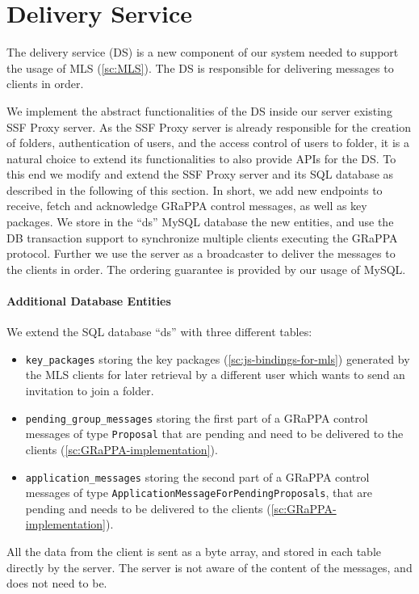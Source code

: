 \section{Delivery Service}\label{ssc:delivery-service}

The delivery service (DS) is a new component of our system needed 
to support the usage of MLS (\cref{sc:MLS}).
The DS is responsible for delivering messages to clients in order.

We implement the abstract functionalities of the DS inside our server existing SSF Proxy
server. As the SSF Proxy server is already responsible for the creation of folders,
authentication of users, and the access control of users to folder, 
it is a natural choice to extend its functionalities to also provide APIs
for the DS.
To this end we modify and extend the SSF Proxy server and its SQL database as described
in the following of this section.
In short, we add new endpoints to receive, fetch and acknowledge
GRaPPA control messages, as well as key packages.
We store in the ``ds'' MySQL database the new entities, and use the
DB transaction support to synchronize multiple clients executing
the GRaPPA protocol. Further we use the server as a broadcaster to
deliver the messages to the clients in order. The ordering guarantee
is provided by our usage of MySQL.

\paragraph{Additional Database Entities}
We extend the SQL database ``ds'' with three different tables:
\begin{itemize}
    \item \texttt{key\_packages} storing the key packages (\cref{sc:js-bindings-for-mls}) generated by the MLS clients for later retrieval by a different user which wants to send an invitation to join a folder.
    \item \texttt{pending\_group\_messages} storing the first part of a GRaPPA control messages of type \texttt{Proposal} that are pending and need to be delivered to the clients (\cref{sc:GRaPPA-implementation}).
    \item \texttt{application\_messages} storing the second part of a GRaPPA control messages of type \texttt{ApplicationMessageForPendingProposals}, that are pending and needs to be delivered to the clients (\cref{sc:GRaPPA-implementation}).
\end{itemize}

All the data from the client is sent as a byte array, and stored in each table
directly by the server. The server is not aware of the content of the messages,
and does not need to be.

